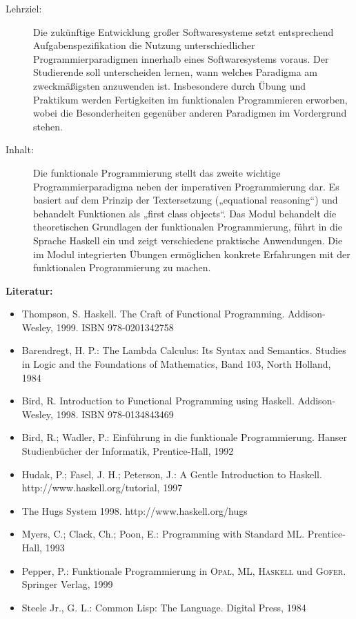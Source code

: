 \documentclass[%
a4paper, %
11pt,               %
leqno,              %
fleqn,              %
]
{scrartcl}
\begin{document}
\begin{description}
  \item[Lehrziel:] Die zukünftige Entwicklung großer Softwaresysteme setzt
    entsprechend Aufgabenspezifikation die Nutzung unterschiedlicher
    Programmierparadigmen innerhalb eines Softwaresystems voraus. Der
    Studierende soll unterscheiden lernen, wann welches Paradigma am
    zweckmäßigsten anzuwenden ist. Insbesondere durch Übung und Praktikum werden
    Fertigkeiten im funktionalen Programmieren erworben, wobei die
    Besonderheiten gegenüber anderen Paradigmen im Vordergrund stehen.
  \item[Inhalt:] Die funktionale Programmierung stellt das zweite wichtige
    Programmierparadigma neben der imperativen Programmierung dar. Es basiert
    auf dem Prinzip der Textersetzung („equational reasoning“) und behandelt
    Funktionen als „first class objects“. Das Modul behandelt die theoretischen
    Grundlagen der funktionalen Programmierung, führt in die Sprache Haskell ein
    und zeigt verschiedene praktische Anwendungen. Die im Modul integrierten
    Übungen ermöglichen konkrete Erfahrungen mit der funktionalen Programmierung
    zu machen.
\end{description}
\textsf{\textbf{Literatur:}}
\begin{itemize}\itemsep0pt
  \item Thompson, S. Haskell. The Craft of Functional Programming.
    Addison-Wesley, 1999. ISBN 978-0201342758
  \item Barendregt, H. P.: The Lambda Calculus: Its Syntax and Semantics.
    Studies in Logic and the Foundations of Mathematics, Band 103, North
    Holland, 1984
  \item Bird, R. Introduction to Functional Programming using Haskell.
    Addison-Wesley, 1998. ISBN 978-0134843469
  \item Bird, R.; Wadler, P.: Einführung in die funktionale Programmierung.
    Hanser Studienbücher der Informatik, Prentice-Hall, 1992
  \item Hudak, P.; Fasel, J. H.; Peterson, J.: A Gentle Introduction to
    Haskell.  http://www.haskell.org/tutorial, 1997
  \item The Hugs System 1998. http://www.haskell.org/hugs
  \item Myers, C.; Clack, Ch.; Poon, E.: Programming with Standard ML.
    Prentice-Hall, 1993
  \item Pepper, P.: Funktionale Programmierung in \textsc{Opal}, \textsc{ML},
    \textsc{Haskell} und \textsc{Gofer}. Springer Verlag, 1999
  \item Steele Jr., G. L.: Common Lisp: The Language. Digital Press, 1984
\end{itemize}
\end{document}
